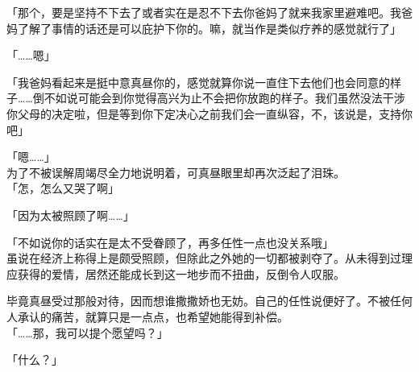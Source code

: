 「那个，要是坚持不下去了或者实在是忍不下去你爸妈了就来我家里避难吧。我爸妈了解了事情的话还是可以庇护下你的。嘛，就当作是类似疗养的感觉就行了」

「……嗯」

「我爸妈看起来是挺中意真昼你的，感觉就算你说一直住下去他们也会同意的样子……倒不如说可能会到你觉得高兴为止不会把你放跑的样子。我们虽然没法干涉你父母的决定啦，但是等到你下定决心之前我们会一直纵容，不，该说是，支持你吧」

「嗯……」\\

为了不被误解周竭尽全力地说明着，可真昼眼里却再次泛起了泪珠。\\

「怎，怎么又哭了啊」

「因为太被照顾了啊……」

「不如说你的话实在是太不受眷顾了，再多任性一点也没关系哦」\\

虽说在经济上称得上是颇受照顾，但除此之外她的一切都被剥夺了。从未得到过理应获得的爱情，居然还能成长到这一地步而不扭曲，反倒令人叹服。

毕竟真昼受过那般对待，因而想谁撒撒娇也无妨。自己的任性说便好了。不被任何人承认的痛苦，就算只是一点点，也希望她能得到补偿。\\

「……那，我可以提个愿望吗？」

「什么？」\\

